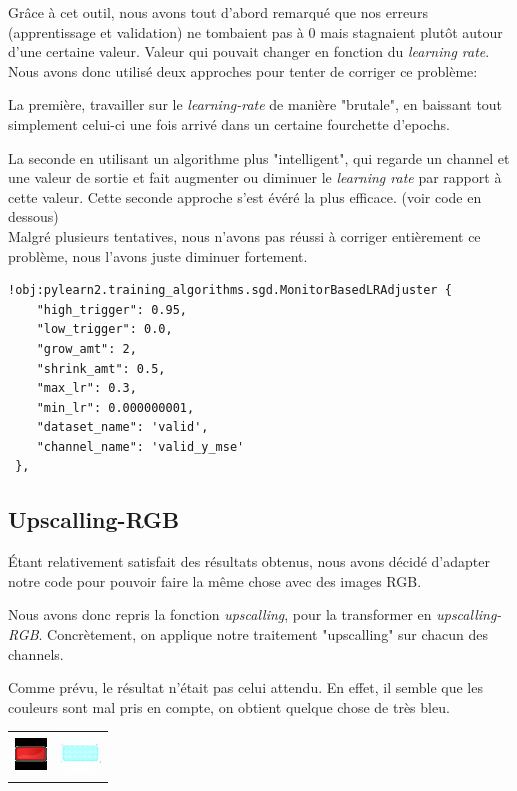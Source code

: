 \documentclass[12pt, a4paper]{article}
\begin{document}
Grâce à cet outil, nous avons tout d'abord remarqué que nos erreurs (apprentissage et validation) ne tombaient pas à 0 mais stagnaient plutôt autour d'une certaine valeur. Valeur qui pouvait changer en fonction du \emph{learning rate}. 
Nous avons donc utilisé deux approches pour tenter de corriger ce problème:

La première, travailler sur le \emph{learning-rate} de manière "brutale", en baissant tout simplement celui-ci une fois arrivé dans un certaine fourchette d'epochs. 

La seconde en utilisant un algorithme plus "intelligent", qui regarde un channel et une valeur de sortie et fait augmenter ou diminuer le \emph{learning rate} par rapport à cette valeur. Cette seconde approche s'est évéré la plus efficace. (voir code en dessous)
\\

Malgré plusieurs tentatives, nous n'avons pas réussi à corriger entièrement ce problème, nous l'avons juste diminuer fortement.

\begin{verbatim}
!obj:pylearn2.training_algorithms.sgd.MonitorBasedLRAdjuster {
    "high_trigger": 0.95,
    "low_trigger": 0.0,
    "grow_amt": 2,
    "shrink_amt": 0.5,
    "max_lr": 0.3,
    "min_lr": 0.000000001,
    "dataset_name": 'valid',
    "channel_name": 'valid_y_mse'
 },
\end{verbatim}
	
	\subsection{Upscalling-RGB}
Étant relativement satisfait des résultats obtenus, nous avons décidé d'adapter notre code pour pouvoir faire la même chose avec des images RGB. 

Nous avons donc repris la fonction \emph{upscalling}, pour la transformer en \emph{upscalling-RGB}. Concrètement, on applique notre traitement "upscalling" sur chacun des channels. 

Comme prévu, le résultat n'était pas celui attendu. En effet, il semble que les couleurs sont mal pris en compte, on obtient quelque chose de très bleu. 

\begin{center}
\begin{tabular}{cc}
   \includegraphics[scale=2]{Images/rectangleR_original.png} &
   \includegraphics[scale=2]
   {Images/rectangleR_reconstruction.png} \\
\end{tabular}
\end{center}
\end{document}
